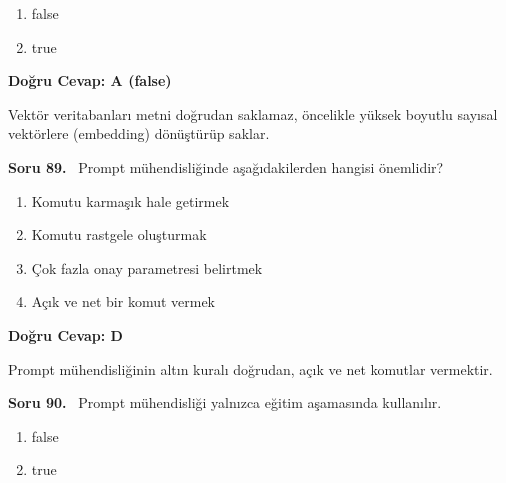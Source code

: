 \documentclass[11pt,a4paper,openany]{book}
\begin{document}
\begin{enumerate}[label=\Alph*), leftmargin=25pt, topsep=4pt, itemsep=2pt]
        \item false
        \item true
\end{enumerate}

\vspace{4pt}
\begin{tcolorbox}[title=Cevap ve Açıklama, colback=gray!3!white, colframe=primarycolor!90!black, arc=2mm, fonttitle=\bfseries\sffamily, top=6pt, bottom=6pt]
    \textbf{Doğru Cevap: A (false)}
    
    \vspace{2pt}
    Vektör veritabanları metni doğrudan saklamaz, öncelikle yüksek boyutlu sayısal vektörlere (embedding) dönüştürüp saklar.
\end{tcolorbox}
\vspace{10pt}
\needspace{5cm}
\vspace{8pt}
\noindent\textbf{\large\sffamily Soru 89.} \ Prompt mühendisliğinde aşağıdakilerden hangisi önemlidir?

\begin{enumerate}[label=\Alph*), leftmargin=25pt, topsep=4pt, itemsep=2pt]
        \item Komutu karmaşık hale getirmek
        \item Komutu rastgele oluşturmak
        \item Çok fazla onay parametresi belirtmek
        \item Açık ve net bir komut vermek
\end{enumerate}

\vspace{4pt}
\begin{tcolorbox}[title=Cevap ve Açıklama, colback=gray!3!white, colframe=primarycolor!90!black, arc=2mm, fonttitle=\bfseries\sffamily, top=6pt, bottom=6pt]
    \textbf{Doğru Cevap: D}
    
    \vspace{2pt}
    Prompt mühendisliğinin altın kuralı doğrudan, açık ve net komutlar vermektir.
\end{tcolorbox}
\vspace{10pt}
\needspace{5cm}
\vspace{8pt}
\noindent\textbf{\large\sffamily Soru 90.} \ Prompt mühendisliği yalnızca eğitim aşamasında kullanılır.

\begin{enumerate}[label=\Alph*), leftmargin=25pt, topsep=4pt, itemsep=2pt]
        \item false
        \item true
\end{enumerate}
\end{document}
